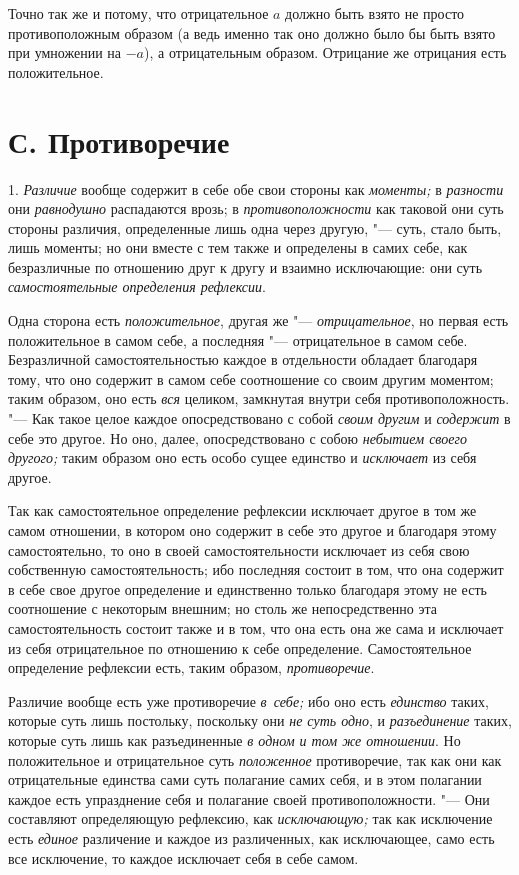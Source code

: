 Точно так же и потому, что отрицательное $a$ должно
быть взято не просто противоположным образом (а ведь именно так оно должно
было бы быть взято при умножении на $-a$), а
отрицательным образом. Отрицание же отрицания есть положительное.

\section[С. Противоречие]{С. Противоречие}
1. {\em Различие} вообще содержит в себе обе свои стороны
как {\em моменты;} в {\em разности} они {\em равнодушно}
распадаются врозь; в {\em противоположности} как
таковой они суть стороны различия, определенные лишь одна через другую, "---
суть, стало быть, лишь моменты; но они вместе с тем также и определены в
самих себе, как безразличные по отношению друг к другу и взаимно
исключающие: они суть {\em самостоятельные определения рефлексии}.

Одна сторона есть {\em положительное}, другая же
"--- {\em отрицательное}, но первая есть положительное в
самом себе, а последняя "--- отрицательное в самом себе. Безразличной
самостоятельностью каждое в отдельности обладает благодаря тому, что оно
содержит в самом себе соотношение со своим другим моментом; таким образом,
оно есть {\em вся} целиком, замкнутая внутри себя
противоположность. "--- Как такое целое каждое опосредствовано с собой
{\em своим другим} и {\em содержит}
в себе это другое. Но оно, далее, опосредствовано с собою
{\em небытием своего другого;} таким образом оно есть
особо сущее единство и {\em исключает} из себя другое.

Так как самостоятельное определение рефлексии исключает другое в том же
самом отношении, в котором оно содержит в себе это другое и благодаря этому
самостоятельно, то оно в своей самостоятельности исключает из себя свою
собственную самостоятельность; ибо последняя состоит в том, что она
содержит в себе свое другое определение и единственно только благодаря
этому не есть соотношение с некоторым внешним; но столь же непосредственно
эта самостоятельность состоит также и в том, что она есть она же сама и
исключает из себя отрицательное по отношению к себе определение.
Самостоятельное определение рефлексии есть, таким образом, {\em противоречие}.

Различие вообще есть уже противоречие {\em в~себе;} ибо
оно есть {\em единство} таких, которые суть лишь
постольку, поскольку они {\em не суть одно}, и
{\em разъединение} таких, которые суть лишь как
разъединенные {\em в одном и том же отношении}. Но
положительное и отрицательное суть {\em положенное}
противоречие, так как они как отрицательные единства сами суть полагание
самих себя, и в этом полагании каждое есть упразднение себя и полагание
своей противоположности. "--- Они составляют определяющую рефлексию, как
{\em исключающую;} так как исключение есть
{\em единое} различение и каждое из различенных, как
исключающее, само есть все исключение, то каждое исключает себя в себе самом.

